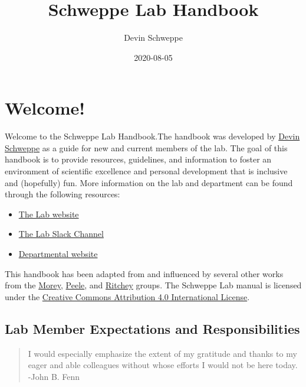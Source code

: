 \documentclass[
]{book}
\title{Schweppe Lab Handbook}
\author{Devin Schweppe}
\date{2020-08-05}
\providecommand{\tightlist}{%
  \setlength{\itemsep}{0pt}\setlength{\parskip}{0pt}}
\begin{document}
\maketitle

{
\setcounter{tocdepth}{1}
\tableofcontents
}
\hypertarget{welcome}{%
\chapter{Welcome!}\label{welcome}}

Welcome to the Schweppe Lab Handbook.The handbook was developed by \href{https://www.schweppelab.org/}{Devin Schweppe} as a guide for new and current members of the lab. The goal of this handbook is to provide resources, guidelines, and information to foster an environment of scientific excellence and personal development that is inclusive and (hopefully) fun. More information on the lab and department can be found through the following resources:

\begin{itemize}
\tightlist
\item
  \href{https://www.schweppelab.org}{The Lab website}
\item
  \href{https://schweppelab.slack.com/}{The Lab Slack Channel}
\item
  \href{https://www.gs.washington.edu/}{Departmental website}
\end{itemize}

This handbook has been adapted from and influenced by several other works from the \href{https://ccmorey.github.io/labHandbook/index.html}{Morey}, \href{https://github.com/jpeelle/peellelab_manual/blob/master/peellelab_manual.pdf}{Peele}, and \href{http://www.thememolab.org/resources/}{Ritchey} groups. The Schweppe Lab manual is licensed under the \href{https://creativecommons.org/licenses/by/4.0/}{Creative Commons Attribution 4.0 International License}.

\hypertarget{lab-member-expectations-and-responsibilities}{%
\section{Lab Member Expectations and Responsibilities}\label{lab-member-expectations-and-responsibilities}}

\begin{quote}
I would especially emphasize the extent of my gratitude and thanks to my eager and able colleagues without whose efforts I would not be here today.
-John B. Fenn
\end{quote}
\end{document}
